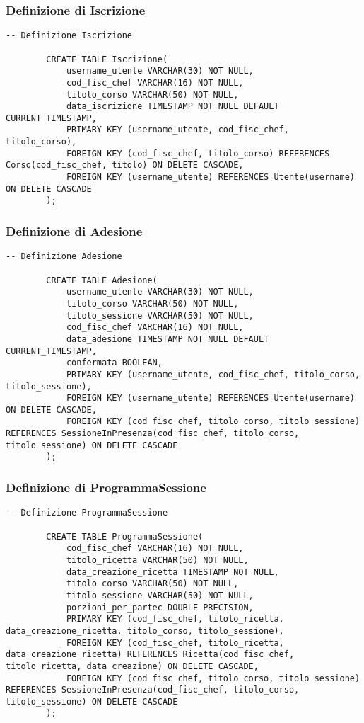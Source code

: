\documentclass[a4paper, 12pt]{article}
\begin{document}
        \subsubsection{Definizione di Iscrizione}
        \begin{lstlisting}[style=sqlstyle]
        -- Definizione Iscrizione
        
        CREATE TABLE Iscrizione(
            username_utente VARCHAR(30) NOT NULL,
            cod_fisc_chef VARCHAR(16) NOT NULL,
            titolo_corso VARCHAR(50) NOT NULL,
            data_iscrizione TIMESTAMP NOT NULL DEFAULT CURRENT_TIMESTAMP,
            PRIMARY KEY (username_utente, cod_fisc_chef, titolo_corso),
            FOREIGN KEY (cod_fisc_chef, titolo_corso) REFERENCES Corso(cod_fisc_chef, titolo) ON DELETE CASCADE,
            FOREIGN KEY (username_utente) REFERENCES Utente(username) ON DELETE CASCADE
        );
        \end{lstlisting}
        \subsubsection{Definizione di Adesione}
        \begin{lstlisting}[style=sqlstyle]
        -- Definizione Adesione
        
        CREATE TABLE Adesione(
            username_utente VARCHAR(30) NOT NULL,
            titolo_corso VARCHAR(50) NOT NULL,
            titolo_sessione VARCHAR(50) NOT NULL,
            cod_fisc_chef VARCHAR(16) NOT NULL,
            data_adesione TIMESTAMP NOT NULL DEFAULT CURRENT_TIMESTAMP,
            confermata BOOLEAN,
            PRIMARY KEY (username_utente, cod_fisc_chef, titolo_corso, titolo_sessione),
            FOREIGN KEY (username_utente) REFERENCES Utente(username) ON DELETE CASCADE,
            FOREIGN KEY (cod_fisc_chef, titolo_corso, titolo_sessione) REFERENCES SessioneInPresenza(cod_fisc_chef, titolo_corso, titolo_sessione) ON DELETE CASCADE
        );
        \end{lstlisting}
        \subsubsection{Definizione di ProgrammaSessione}
        \begin{lstlisting}[style=sqlstyle]
        -- Definizione ProgrammaSessione
        
        CREATE TABLE ProgrammaSessione(
            cod_fisc_chef VARCHAR(16) NOT NULL,
            titolo_ricetta VARCHAR(50) NOT NULL,
            data_creazione_ricetta TIMESTAMP NOT NULL,
            titolo_corso VARCHAR(50) NOT NULL,
            titolo_sessione VARCHAR(50) NOT NULL,
            porzioni_per_partec DOUBLE PRECISION,
            PRIMARY KEY (cod_fisc_chef, titolo_ricetta, data_creazione_ricetta, titolo_corso, titolo_sessione),
            FOREIGN KEY (cod_fisc_chef, titolo_ricetta, data_creazione_ricetta) REFERENCES Ricetta(cod_fisc_chef, titolo_ricetta, data_creazione) ON DELETE CASCADE,
            FOREIGN KEY (cod_fisc_chef, titolo_corso, titolo_sessione) REFERENCES SessioneInPresenza(cod_fisc_chef, titolo_corso, titolo_sessione) ON DELETE CASCADE
        );
        \end{lstlisting}
        \newpage
\end{document}
